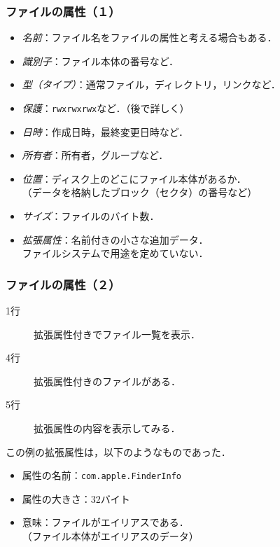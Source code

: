 \documentclass[handout]{beamer}                   %
\begin{document}
\begin{frame}
  \frametitle{ファイルの属性（１）}
  \begin{itemize}
  \item \emph{名前}：ファイル名をファイルの属性と考える場合もある．
  \item \emph{識別子}：ファイル本体の番号など．
  \item \emph{型（タイプ）}：通常ファイル，ディレクトリ，リンクなど．
  \item \emph{保護}：\texttt{rwxrwxrwx}など．（後で詳しく）
  \item \emph{日時}：作成日時，最終変更日時など．
  \item \emph{所有者}：所有者，グループなど．
  \item \emph{位置}：ディスク上のどこにファイル本体があるか．\\
    （データを格納したブロック（セクタ）の番号など）
  \item \emph{サイズ}：ファイルのバイト数．
  \item \emph{拡張属性}：名前付きの小さな追加データ．\\
    ファイルシステムで用途を定めていない．
  \end{itemize}
\end{frame}

\begin{frame}
  \frametitle{ファイルの属性（２）}
  \vspace{-0.2cm}
  \begin{minipage}{0.71\columnwidth}
  \begin{description}
  \item[1行] 拡張属性付きでファイル一覧を表示．
  \item[4行] 拡張属性付きのファイルがある．
  \item[5行] 拡張属性の内容を表示してみる．
  \end{description}
  この例の拡張属性は，以下のようなものであった．
  \begin{itemize}
  \item 属性の名前：\texttt{com.apple.FinderInfo}
  \item 属性の大きさ：32バイト
  \item 意味：ファイルがエイリアスである．\\
    （ファイル本体がエイリアスのデータ）
  \end{itemize}
  \end{minipage}
  \begin{minipage}{0.27\columnwidth}
  \end{minipage}
\end{frame}
\end{document}

